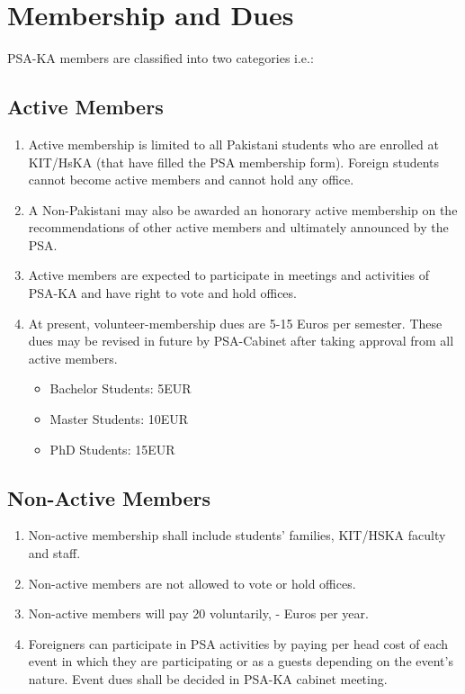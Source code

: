 \section{Membership and Dues }
PSA-KA members are classified into two categories i.e.: 
\subsection{Active Members }
\begin{enumerate}
	\item Active membership is limited to all Pakistani students who are enrolled at KIT/HsKA (that have filled the PSA membership form). Foreign students cannot become active members and cannot hold any office. 
	\item A Non-Pakistani may also be awarded an honorary active membership on the recommendations of other active members and ultimately announced by the PSA.
	\item Active members are expected to participate in meetings and activities of PSA-KA and have right to vote and hold offices. 
	\item At present, volunteer-membership dues are 5-15 Euros per semester. These dues may be revised in future by PSA-Cabinet after taking approval from all active members. 
\begin{itemize}
	\item 	Bachelor Students: 5EUR
	\item 	Master Students: 10EUR
	\item 	PhD Students: 15EUR
\end{itemize}
\end{enumerate}

\subsection{Non-Active Members }
\begin{enumerate}
	\item Non-active membership shall include students’ families, KIT/HSKA faculty and staff.  
	\item Non-active members are not allowed to vote or hold offices. 
	\item Non-active members will pay 20 voluntarily, - Euros per year. 
	\item Foreigners can participate in PSA activities by paying per head cost of each event in which they are participating or as a guests depending on the event's nature. Event dues shall be decided in PSA-KA cabinet meeting. 
\end{enumerate}
